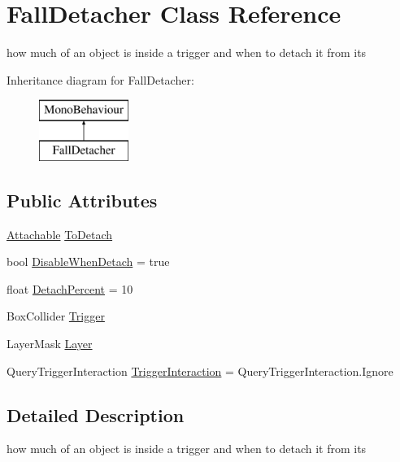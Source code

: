 \hypertarget{class_fall_detacher}{}\section{Fall\+Detacher Class Reference}
\label{class_fall_detacher}


how much of an object is inside a trigger and when to detach it from its  


Inheritance diagram for Fall\+Detacher\+:\begin{figure}[H]
\begin{center}
\leavevmode
\includegraphics[height=2.000000cm]{class_fall_detacher}
\end{center}
\end{figure}
\subsection*{Public Attributes}
\begin{DoxyCompactItemize}
\item 
\mbox{\hyperlink{class_attachable}{Attachable}} \mbox{\hyperlink{class_fall_detacher_a3fcd2148311ff565d2db4c207e5bf029}{To\+Detach}}
\item 
bool \mbox{\hyperlink{class_fall_detacher_a0fa65bb2faf80741ec4e709cd0b429f9}{Disable\+When\+Detach}} = true
\item 
float \mbox{\hyperlink{class_fall_detacher_a1823670159ceefb32454159eecec241d}{Detach\+Percent}} = 10
\item 
Box\+Collider \mbox{\hyperlink{class_fall_detacher_afd5f218efddea93eb9719887f7e3f626}{Trigger}}
\item 
Layer\+Mask \mbox{\hyperlink{class_fall_detacher_a419bb5e153deedf442e7a0320591fb8a}{Layer}}
\item 
Query\+Trigger\+Interaction \mbox{\hyperlink{class_fall_detacher_a6766b4c631f6df7859c17f9cc9750167}{Trigger\+Interaction}} = Query\+Trigger\+Interaction.\+Ignore
\end{DoxyCompactItemize}


\subsection{Detailed Description}
how much of an object is inside a trigger and when to detach it from its 



